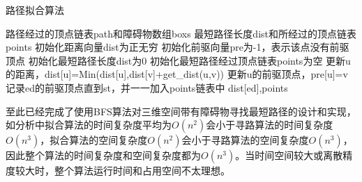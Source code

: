 \begin{algorithm}[!htb]
    \caption{路径拟合算法}
    \label{alg::bfs_path_fit}
    \begin{algorithmic}[1]
        \Require 路径经过的顶点链表path和障碍物数组boxs
        \Ensure 最短路径长度dist和所经过的顶点链表points
            \State 初始化距离向量dist为正无穷
            \State 初始化前驱向量pre为-1，表示该点没有前驱顶点
            \State 初始化最短路径长度dist为0
            \State 初始化最短路径经过顶点链表points为空
                        \State 更新u的距离，dist[u]=Min(dist[u],dist[v]+get\_dist(u,v))
                        \State 更新u的前驱顶点，pre[u]=v
                    \EndIf
                \EndFor
            \EndFor
            \State 记录ed的前驱顶点直到st，并一一加入points链表中
            \State \Return dist[ed],points
        \EndFunction
    \end{algorithmic}
\end{algorithm}
\par 至此已经完成了使用BFS算法对三维空间带有障碍物寻找最短路径的设计和实现，如分析中拟合算法的时间复杂度平均为$O(n^2)$会小于寻路算法的时间复杂度$O(n^3)$，拟合算法的空间复杂度$O(n^2)$会小于寻路算法的空间复杂度$O(n^3)$，因此整个算法的时间复杂度和空间复杂度都为$O(n^3)$。当时间空间较大或离散精度较大时，整个算法运行时间和占用空间不太理想。

\FloatBarrier

